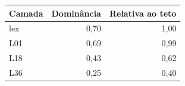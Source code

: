 \begin{tabular}{lrr}
\toprule
Camada & Dominância & Relativa ao teto \\
\midrule
lex & 0,70 & 1,00 \\
L01 & 0,69 & 0,99 \\
L18 & 0,43 & 0,62 \\
L36 & 0,25 & 0,40 \\
\bottomrule
\end{tabular}
